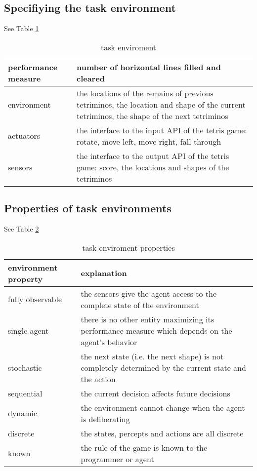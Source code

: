 \documentclass[12pt]{article}
\begin{document}
\subsection{Specifiying the task environment}
See Table \ref{tab:environment}
\begin{table}[htb]
  \centering
  \begin{tabularx}{\textwidth}{|l|X|} \hline
    performance measure & number of horizontal lines filled and cleared \\ \hline
    environment & the locations of the remains of previous tetriminos, the location and shape of the current tetriminos, the shape of the next tetriminos \\ \hline
    actuators & the interface to the input API of the tetris game: rotate, move left, move right, fall through \\ \hline
    sensors & the interface to the output API of the tetris game: score, the locations and shapes of the tetriminos \\ \hline
  \end{tabularx}
  \caption{task enviroment}
  \label{tab:environment}
\end{table}
\subsection{Properties of task environments}
See Table \ref{tab:properties}
\begin{table}[htb]
  \centering
  \begin{tabularx}{\textwidth}{|l|X|} \hline
    environment property & explanation \\ \hline
    fully observable & the sensors give the agent access to the complete state of the environment \\ \hline
    single agent & there is no other entity maximizing its performance measure which depends on the agent's behavior \\ \hline
    stochastic & the next state (i.e. the next shape) is not completely determined by the current state and the action \\ \hline
    sequential & the current decision affects future decisions \\ \hline
    dynamic & the environment cannot change when the agent is deliberating \\ \hline
    discrete & the states, percepts and actions are all discrete \\ \hline
    known & the rule of the game is known to the programmer or agent \\ \hline
  \end{tabularx}
  \caption{task enviroment properties}
  \label{tab:properties}
\end{table}
\end{document}
